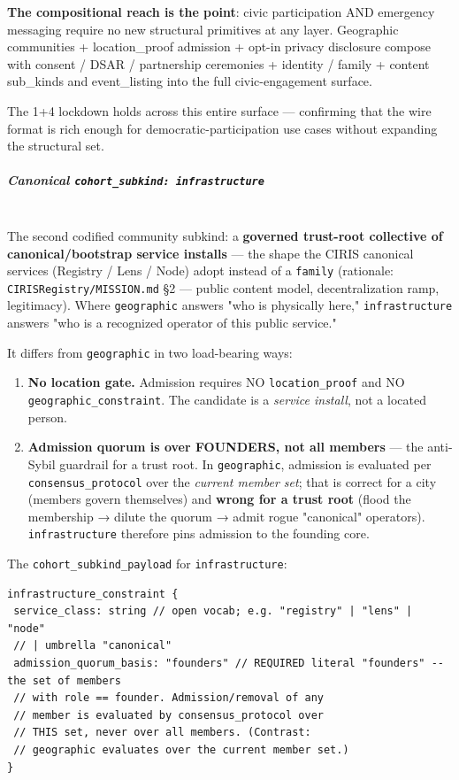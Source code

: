 \documentclass[11pt]{article}
\begin{document}
\textbf{The compositional reach is the point}: civic participation AND emergency messaging require no new structural primitives at any layer. Geographic communities + location\_proof admission + opt-in privacy disclosure compose with consent / DSAR / partnership ceremonies + identity / family + content sub\_kinds and event\_listing into the full civic-engagement surface.


The 1+4 lockdown holds across this entire surface — confirming that the wire format is rich enough for democratic-participation use cases without expanding the structural set.


\subparagraph{Canonical \texttt{cohort\_subkind: infrastructure}}\mbox{}\\


The second codified community subkind: a \textbf{governed trust-root collective of canonical/bootstrap service installs} — the shape the CIRIS canonical services (Registry / Lens / Node) adopt instead of a \texttt{family} (rationale: \texttt{CIRISRegistry/MISSION.md} §2 — public content model, decentralization ramp, legitimacy). Where \texttt{geographic} answers "who is physically here," \texttt{infrastructure} answers "who is a recognized operator of this public service."


It differs from \texttt{geographic} in two load-bearing ways:


\begin{enumerate}\setlength\itemsep{0pt}
\item \textbf{No location gate.} Admission requires NO \texttt{location\_proof} and NO \texttt{geographic\_constraint}. The candidate is a \textit{service install}, not a located person.
\item \textbf{Admission quorum is over FOUNDERS, not all members} — the anti-Sybil guardrail for a trust root. In \texttt{geographic}, admission is evaluated per \texttt{consensus\_protocol} over the \textit{current member set}; that is correct for a city (members govern themselves) and \textbf{wrong for a trust root} (flood the membership → dilute the quorum → admit rogue "canonical" operators). \texttt{infrastructure} therefore pins admission to the founding core.
\end{enumerate}


The \texttt{cohort\_subkind\_payload} for \texttt{infrastructure}:


\begin{lstlisting}
infrastructure_constraint {
 service_class: string // open vocab; e.g. "registry" | "lens" | "node"
 // | umbrella "canonical"
 admission_quorum_basis: "founders" // REQUIRED literal "founders" -- the set of members
 // with role == founder. Admission/removal of any
 // member is evaluated by consensus_protocol over
 // THIS set, never over all members. (Contrast:
 // geographic evaluates over the current member set.)
}
\end{lstlisting}
\end{document}
